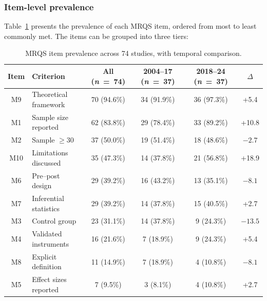 \documentclass[etq]{acnsart}
\begin{document}
	\subsubsection{Item-level prevalence}
	\label{sec:results_rq2_items}
	
	Table~\ref{tab:mrqs_prevalence} presents the prevalence of each MRQS item, ordered from most to least commonly met. The items can be grouped into three tiers:
	
	\begin{table}[b]
		\centering
		\caption{MRQS item prevalence across 74 studies, with temporal comparison.}
		\label{tab:mrqs_prevalence}
		\begin{tabular}{@{}clcccc@{}}
			\toprule
			\textbf{Item} & \hfill \textbf{Criterion} & \textbf{All (\textit{n}~=~74)} & \textbf{2004--17 (\textit{n}~=~37)} & \textbf{2018--24 (\textit{n}~=~37)} & \textbf{$\Delta$} \\
			\midrule
			M9 & Theoretical framework & 70 (94.6\%) & 34 (91.9\%) & 36 (97.3\%) & +5.4 \\
			M1 & Sample size reported & 62 (83.8\%) & 29 (78.4\%) & 33 (89.2\%) & +10.8 \\
			M2 & Sample $\geq 30$ & 37 (50.0\%) & 19 (51.4\%) & 18 (48.6\%) & $-2.7$ \\
			M10 & Limitations discussed & 35 (47.3\%) & 14 (37.8\%) & 21 (56.8\%) & +18.9 \\
			M6 & Pre--post design & 29 (39.2\%) & 16 (43.2\%) & 13 (35.1\%) & $-8.1$ \\
			M7 & Inferential statistics & 29 (39.2\%) & 14 (37.8\%) & 15 (40.5\%) & +2.7 \\
			M3 & Control group & 23 (31.1\%) & 14 (37.8\%) & 9 (24.3\%) & $-13.5$ \\
			M4 & Validated instruments & 16 (21.6\%) & 7 (18.9\%) & 9 (24.3\%) & +5.4 \\
			M8 & Explicit definition & 11 (14.9\%) & 7 (18.9\%) & 4 (10.8\%) & $-8.1$ \\
			M5 & Effect sizes reported & 7 (9.5\%) & 3 (8.1\%) & 4 (10.8\%) & +2.7 \\
			\bottomrule
		\end{tabular}
	\end{table}
	
\end{document}
